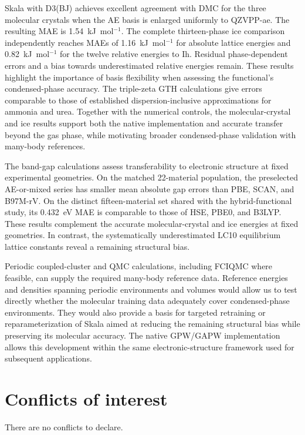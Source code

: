 \documentclass[10pt,a4paper,twocolumn]{article}
\begin{document}
Skala with D3(BJ) achieves excellent agreement with DMC for the three molecular crystals when the AE basis is enlarged uniformly to QZVPP-ae. The resulting MAE is 1.54~kJ~mol$^{-1}$. The complete thirteen-phase ice comparison independently reaches MAEs of 1.16~kJ~mol$^{-1}$ for absolute lattice energies and 0.82~kJ~mol$^{-1}$ for the twelve relative energies to Ih. Residual phase-dependent errors and a bias towards underestimated relative energies remain. These results highlight the importance of basis flexibility when assessing the functional's condensed-phase accuracy. The triple-zeta GTH calculations give errors comparable to those of established dispersion-inclusive approximations for ammonia and urea. Together with the numerical controls, the molecular-crystal and ice results support both the native implementation and accurate transfer beyond the gas phase, while motivating broader condensed-phase validation with many-body references.

The band-gap calculations assess transferability to electronic structure at fixed experimental geometries. On the matched 22-material population, the preselected AE-or-mixed series has smaller mean absolute gap errors than PBE, SCAN, and B97M-rV. On the distinct fifteen-material set shared with the hybrid-functional study, its 0.432~eV MAE is comparable to those of HSE, PBE0, and B3LYP. These results complement the accurate molecular-crystal and ice energies at fixed geometries. In contrast, the systematically underestimated LC10 equilibrium lattice constants reveal a remaining structural bias.

Periodic coupled-cluster and QMC calculations, including FCIQMC where feasible, can supply the required many-body reference data. Reference energies and densities spanning periodic environments and volumes would allow us to test directly whether the molecular training data adequately cover condensed-phase environments. They would also provide a basis for targeted retraining or reparameterization of Skala aimed at reducing the remaining structural bias while preserving its molecular accuracy. The native GPW/GAPW implementation allows this development within the same electronic-structure framework used for subsequent applications.

\section*{Conflicts of interest}
There are no conflicts to declare.
\end{document}
